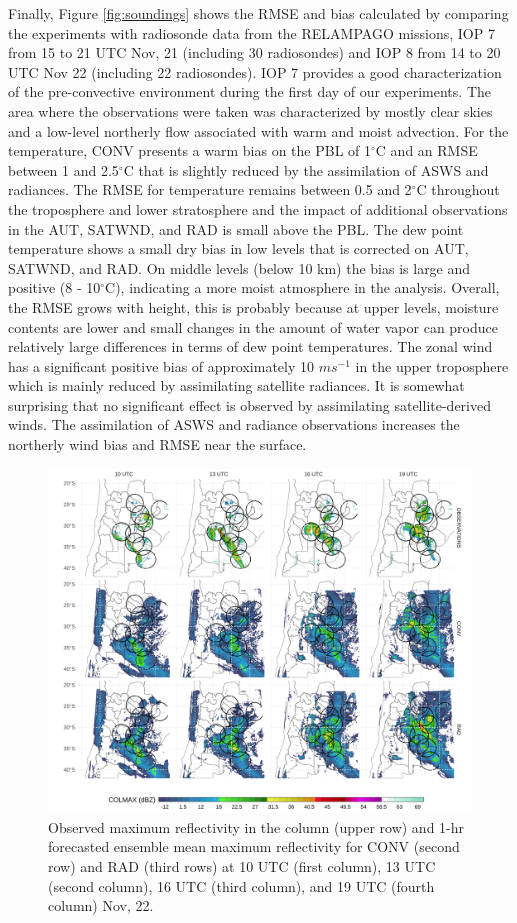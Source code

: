 \documentclass[final,5p,times,twocolumn,authoryear]{elsarticle} %
\begin{document}
Finally, Figure \ref{fig:soundings} shows the RMSE and bias calculated by comparing the experiments with radiosonde data from the RELAMPAGO missions, IOP 7 from 15 to 21 UTC Nov, 21 (including 30 radiosondes) and IOP 8 from 14 to 20 UTC Nov 22 (including 22 radiosondes). IOP 7 provides a good characterization of the pre-convective environment during the first day of our experiments. The area where the observations were taken was characterized by mostly clear skies and a low-level northerly flow associated with warm and moist advection. For the temperature, CONV presents a warm bias on the PBL of 1\(^{\circ}\)C and an RMSE between 1 and 2.5\(^{\circ}\)C that is slightly reduced by the assimilation of ASWS and radiances. The RMSE for temperature remains between 0.5 and 2\(^{\circ}\)C throughout the troposphere and lower stratosphere and the impact of additional observations in the AUT, SATWND, and RAD is small above the PBL. The dew point temperature shows a small dry bias in low levels that is corrected on AUT, SATWND, and RAD. On middle levels (below 10 km) the bias is large and positive (8 - 10\(^{\circ}\)C), indicating a more moist atmosphere in the analysis. Overall, the RMSE grows with height, this is probably because at upper levels, moisture contents are lower and small changes in the amount of water vapor can produce relatively large differences in terms of dew point temperatures. The zonal wind has a significant positive bias of approximately 10 \(ms^{-1}\) in the upper troposphere which is mainly reduced by assimilating satellite radiances. It is somewhat surprising that no significant effect is observed by assimilating satellite-derived winds. The assimilation of ASWS and radiance observations increases the northerly wind bias and RMSE near the surface.



\begin{figure}[h]
\includegraphics[width=1\linewidth]{../figures/dbz-mean-1} \caption{Observed maximum reflectivity in the column (upper row) and 1-hr forecasted ensemble mean maximum reflectivity for CONV (second row) and RAD (third rows) at 10 UTC (first column), 13 UTC (second column), 16 UTC (third column), and 19 UTC (fourth column) Nov, 22.}\label{fig:dbz-mean}
\end{figure}
\end{document}
